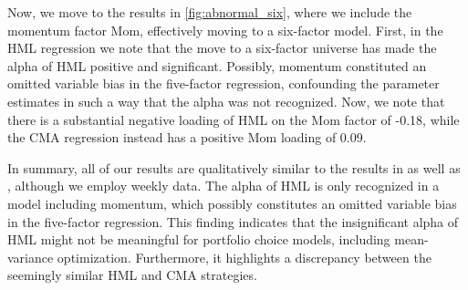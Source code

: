 Now, we move to the results in \autoref{fig:abnormal_six}, where we include the momentum factor Mom, effectively moving to a six-factor model. First, in the HML regression we note that the move to a six-factor universe has made the alpha of HML positive and significant. Possibly, momentum constituted an omitted variable bias in the five-factor regression, confounding the parameter estimates in such a way that the alpha was not recognized. Now, we note that there is a substantial negative loading of HML on the Mom factor of -0.18, while the CMA regression instead has a positive Mom loading of 0.09.

In summary, all of our results are qualitatively similar to the results in \textcite{FF2015} as well as \textcite{Asness2015}, although we employ weekly data. The alpha of HML is only recognized in a model including momentum, which possibly constitutes an omitted variable bias in the five-factor regression. This finding indicates that the insignificant alpha of HML might not be meaningful for portfolio choice models, including mean-variance optimization. Furthermore, it highlights a discrepancy between the seemingly similar HML and CMA strategies.

